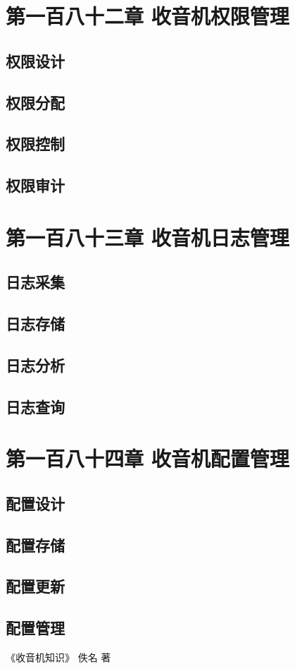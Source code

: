 \documentclass[12pt,UTF8]{ctexbook}
\begin{document}
\chapter{第一百八十二章 收音机权限管理}

\section{权限设计}
\section{权限分配}
\section{权限控制}
\section{权限审计}

\chapter{第一百八十三章 收音机日志管理}

\section{日志采集}
\section{日志存储}
\section{日志分析}
\section{日志查询}

\chapter{第一百八十四章 收音机配置管理}

\section{配置设计}
\section{配置存储}
\section{配置更新}
\section{配置管理}

\backmatter

《收音机知识》 佚名 著
\end{document}
